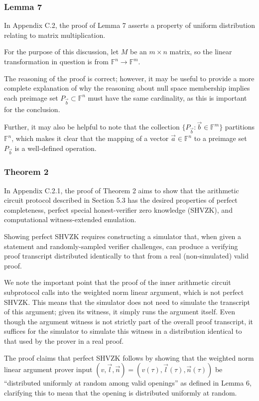 \documentclass{article}
\begin{document}
\subsubsection{Lemma 7}

In Appendix C.2, the proof of Lemma 7 asserts a property of uniform distribution relating to matrix multiplication.

For the purpose of this discussion, let $M$ be an $m \times n$ matrix, so the linear transformation in question is from $\mathbb{F}^n \to \mathbb{F}^m$.

The reasoning of the proof is correct; however, it may be useful to provide a more complete explanation of why the reasoning about null space membership implies each preimage set $P_{\vec{b}} \subset \mathbb{F}^n$ must have the same cardinality, as this is important for the conclusion.

Further, it may also be helpful to note that the collection $\{ P_{\vec{b}} : \vec{b} \in \mathbb{F}^m \}$ partitions $\mathbb{F}^n$, which makes it clear that the mapping of a vector $\vec{a} \in \mathbb{F}^n$ to a preimage set $P_{\vec{b}}$ is a well-defined operation.


\subsubsection{Theorem 2}

In Appendix C.2.1, the proof of Theorem 2 aims to show that the arithmetic circuit protocol described in Section 5.3 has the desired properties of perfect completeness, perfect special honest-verifier zero knowledge (SHVZK), and computational witness-extended emulation.

Showing perfect SHVZK requires constructing a simulator that, when given a statement and randomly-sampled verifier challenges, can produce a verifying proof transcript distributed identically to that from a real (non-simulated) valid proof.

We note the important point that the proof of the inner arithmetic circuit subprotocol calls into the weighted norm linear argument, which is not perfect SHVZK.
This means that the simulator does not need to simulate the transcript of this argument; given its witness, it simply runs the argument itself.
Even though the argument witness is not strictly part of the overall proof transcript, it suffices for the simulator to simulate this witness in a distribution identical to that used by the prover in a real proof.

The proof claims that perfect SHVZK follows by showing that the weighted norm linear argument prover input $(v, \vec{l}, \vec{n}) = (v(\tau), \vec{l}(\tau), \vec{n}(\tau))$ be ``distributed uniformly at random among valid openings'' as defined in Lemma 6, clarifying this to mean that the opening is distributed uniformly at random.
\end{document}
